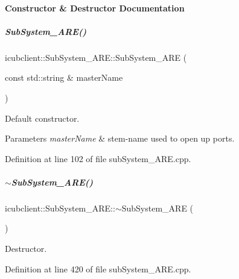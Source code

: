 \paragraph{Constructor \& Destructor Documentation}
\mbox{\label{group__icubclient__subsystems_a844f5ba28f7944ba14ccecc2801a4824}} 
\subparagraph{\texorpdfstring{Sub\+System\+\_\+\+A\+R\+E()}{SubSystem\_ARE()}}
{\footnotesize\ttfamily icubclient\+::\+Sub\+System\+\_\+\+A\+R\+E\+::\+Sub\+System\+\_\+\+A\+RE (\begin{DoxyParamCaption}\item[{const std\+::string \&}]{master\+Name }\end{DoxyParamCaption})}



Default constructor. 


\begin{DoxyParams}{Parameters}
{\em master\+Name} & stem-\/name used to open up ports. \\
\hline
\end{DoxyParams}


Definition at line 102 of file sub\+System\+\_\+\+A\+R\+E.\+cpp.

\mbox{\label{group__icubclient__subsystems_a7ffb007fd4a83e42d5a76d28087728b6}} 
\subparagraph{\texorpdfstring{$\sim$\+Sub\+System\+\_\+\+A\+R\+E()}{~SubSystem\_ARE()}}
{\footnotesize\ttfamily icubclient\+::\+Sub\+System\+\_\+\+A\+R\+E\+::$\sim$\+Sub\+System\+\_\+\+A\+RE (\begin{DoxyParamCaption}{ }\end{DoxyParamCaption})}



Destructor. 



Definition at line 420 of file sub\+System\+\_\+\+A\+R\+E.\+cpp.



